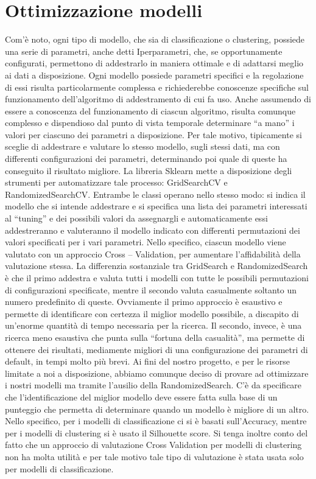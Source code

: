 \documentclass[12pt,oneside]{article}
\begin{document}
\section{Ottimizzazione modelli}
    \begin{justify}
        Com’è noto, ogni tipo di modello, che sia di classificazione o clustering, possiede una serie di parametri, anche detti Iperparametri, che, se opportunamente configurati, permettono di addestrarlo in maniera ottimale e di adattarsi meglio ai dati a disposizione. Ogni modello possiede parametri specifici e la regolazione di essi risulta particolarmente complessa e richiederebbe conoscenze specifiche sul funzionamento dell’algoritmo di addestramento di cui fa uso. Anche assumendo di essere a conoscenza del funzionamento di ciascun algoritmo, risulta comunque complesso e dispendioso dal punto di vista temporale determinare “a mano” i valori per ciascuno dei parametri a disposizione. Per tale motivo, tipicamente si sceglie di addestrare e valutare lo stesso modello, sugli stessi dati, ma con differenti configurazioni dei parametri, determinando poi quale di queste ha conseguito il risultato migliore. 
        La libreria Sklearn mette a disposizione degli strumenti per automatizzare tale processo: GridSearchCV e RandomizedSearchCV. Entrambe le classi operano nello stesso modo: si indica il modello che si intende addestrare e si specifica una lista dei parametri interessati al “tuning” e dei possibili valori da assegnargli e automaticamente essi addestreranno e valuteranno il modello indicato con differenti permutazioni dei valori specificati per i vari parametri. Nello specifico, ciascun modello viene valutato con un approccio Cross – Validation, per aumentare l’affidabilità della valutazione stessa. La differenzia sostanziale tra GridSearch e RandomizedSearch è che il primo addestra e valuta tutti i modelli con tutte le possibili permutazioni di configurazioni specificate, mentre il secondo valuta casualmente soltanto un numero predefinito di queste. Ovviamente il primo approccio è esaustivo e permette di identificare con certezza il miglior modello possibile, a discapito di un’enorme quantità di tempo necessaria per la ricerca. Il secondo, invece, è una ricerca meno esaustiva che punta sulla “fortuna della casualità”, ma permette di ottenere dei risultati, mediamente migliori di una configurazione dei parametri di default, in tempi molto più brevi.
        Ai fini del nostro progetto, e per le risorse limitate a noi a disposizione, abbiamo comunque deciso di provare ad ottimizzare i nostri modelli ma tramite l’ausilio della RandomizedSearch. C’è da specificare che l’identificazione del miglior modello deve essere fatta sulla base di un punteggio che permetta di determinare quando un modello è migliore di un altro. Nello specifico, per i modelli di classificazione ci si è basati sull’Accuracy, mentre per i modelli di clustering si è usato il Silhouette score. Si tenga inoltre conto del fatto che un approccio di valutazione Cross Validation per modelli di clustering non ha molta utilità e per tale motivo tale tipo di valutazione è stata usata solo per modelli di classificazione. 

\end{justify}
\end{document}
